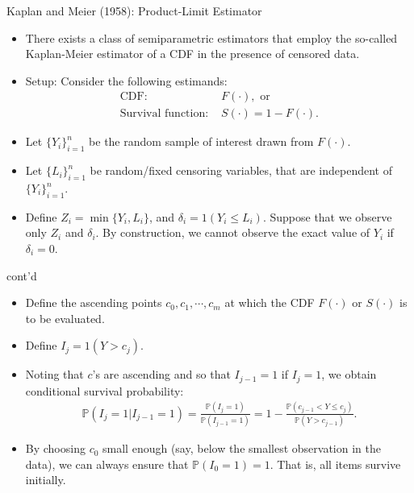 \documentclass[xcolor=svgnames,dvipdfmx,cjk]{beamer}
\theoremstyle{example}
\def\P{\mathbb{P}}
\begin{document}
\begin{frame}{Kaplan and Meier (1958): Product-Limit Estimator}
      \begin{itemize}
            \item There exists a class of semiparametric estimators 
                  that employ the so-called Kaplan-Meier estimator of a CDF
                  in the presence of censored data.
            \item \alert{Setup}: Consider the following estimands:
                  \begin{align*}
                        \text{CDF: }& F(\cdot), \text{ or}\\
                        \text{Survival function: }& S(\cdot) = 1 - F(\cdot).
                  \end{align*}
            \item Let $\{Y_i\}_{i=1}^n$ be the random sample of interest drawn from $F(\cdot)$.
            \item Let $\{L_i\}_{i=1}^n$ be random/fixed censoring variables, that are independent of $\{Y_i\}_{i=1}^n$.
            \item Define $Z_i = \min\{Y_i, L_i\}$, and $\delta_i = 1(Y_i \leq L_i)$. 
                  Suppose that we observe only $Z_i$ and $\delta_i$. 
                  By construction, 
                  we cannot observe the exact value of $Y_i$ if $\delta_i = 0$.
      \end{itemize}
\end{frame}

\begin{frame}{cont'd}
      \begin{itemize}
            \item Define the ascending points $c_0, c_1, \cdots, c_m$ 
                  at which the CDF $F(\cdot)$ or $S(\cdot)$ is to be evaluated.
            \item Define $I_j = 1(Y > c_j)$.
            \item Noting that $c$'s are ascending 
                  and so that $I_{j-1} = 1$ if $I_j = 1$, 
                  we obtain conditional survival probability:
                  \begin{align*}
                        \P(I_j=1 | I_{j-1}=1) 
                              = \frac{\P(I_j=1)}{\P(I_{j-1}=1)}
                              = 1 - \frac{\P(c_{j-1} < Y \leq c_j)}{\P(Y>c_{j-1})}.
                  \end{align*}
            \item By choosing $c_0$ small enough (say, below the smallest observation in the data),
                  we can always ensure that $\P(I_0=1)=1$. 
                  That is, all items survive initially.
      \end{itemize}
\end{frame}
\end{document}
